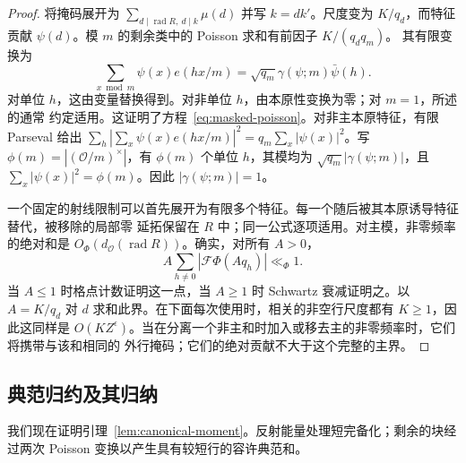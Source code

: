 \begin{proof}
将掩码展开为 \(\sum_{d\mid\operatorname{rad}R,\ d\mid k}\mu(d)\) 并写 \(k=dk'\)。尺度变为
\(K/q_d\)，而特征贡献 \(\psi(d)\)。模 \(m\) 的剩余类中的 Poisson 求和有前因子 \(K/(q_dq_m)\)。
其有限变换为
\[
 \sum_{x\bmod m}\psi(x)e(hx/m)
   =\sqrt{q_m}\gamma(\psi;m)\bar\psi(h).
\]
对单位 \(h\)，这由变量替换得到。对非单位 \(h\)，由本原性变换为零；对 \(m=1\)，所述的通常
约定适用。这证明了方程~\eqref{eq:masked-poisson}。对非主本原特征，有限 Parseval 给出
\(\sum_h|\sum_x\psi(x)e(hx/m)|^2=q_m\sum_x|\psi(x)|^2\)。写
\(\phi(m)=|(\mathcal O/m)^\times|\)，有 \(\phi(m)\) 个单位 \(h\)，其模均为
\(\sqrt{q_m}|\gamma(\psi;m)|\)，且 \(\sum_x|\psi(x)|^2=\phi(m)\)。因此 \(|\gamma(\psi;m)|=1\)。

一个固定的射线限制可以首先展开为有限多个特征。每一个随后被其本原诱导特征替代，被移除的局部零
延拓保留在 \(R\) 中；同一公式逐项适用。对主模，非零频率的绝对和是
\(O_\Phi(d_{\mathcal O}(\operatorname{rad}R))\)。确实，对所有 \(A>0\)，
\[
 A\sum_{h\ne0}|\mathcal F\Phi(Aq_h)|\ll_\Phi1.
\]
当 \(A\le1\) 时格点计数证明这一点，当 \(A\ge1\) 时 Schwartz 衰减证明之。以 \(A=K/q_d\) 对
\(d\) 求和此界。在下面每次使用时，相关的非空行尺度都有 \(K\ge1\)，因此这同样是
\(O(KZ^\epsilon)\)。当在分离一个非主和时加入或移去主的非零频率时，它们将携带与该和相同的
外行掩码；它们的绝对贡献不大于这个完整的主界。
\end{proof}

\subsection{典范归约及其归纳}

我们现在证明引理~\ref{lem:canonical-moment}。反射能量处理短完备化；剩余的块经过两次 Poisson
变换以产生具有较短行的容许典范和。

